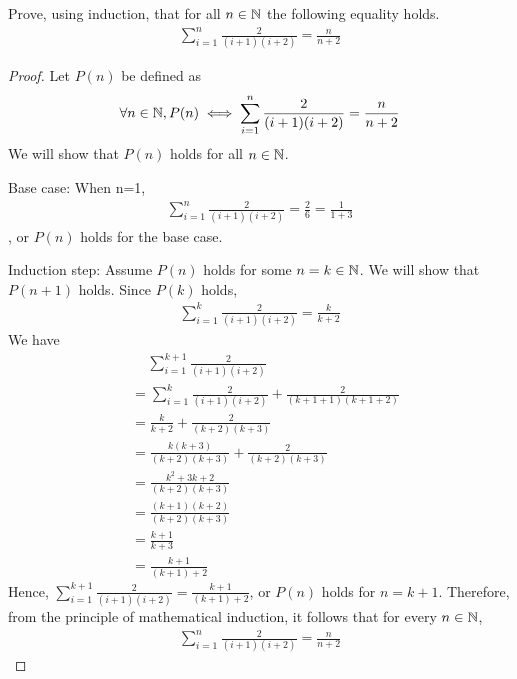 \begin{question}
    \normalfont
    Prove, using induction, that for all $n\in\mathbb N$ the following equality holds.
    \[
        \begin{aligned}
            \sum_{i=1}^{n}\frac{2}{(i+1)(i+2)}=\frac{n}{n+2}
        \end{aligned}
    \]
\end{question}

\begin{proof}
    \renewcommand{\qedsymbol}{$\blacksquare$}
    Let $P(n)$ be defined as 
    \[
        \begin{aligned}
            \forall n\in\mathbb N, P(n)\iff \sum_{i=1}^{n}\frac{2}{(i+1)(i+2)}=\frac{n}{n+2}
        \end{aligned}
    \]
    We will show that $P(n)$ holds for all $n\in\mathbb N$.

    Base case: When n=1, 
    \[
        \begin{aligned}
            \sum_{i=1}^{n}\frac{2}{(i+1)(i+2)}=\frac{2}{6}=\frac{1}{1+3}
        \end{aligned}
    \]
    , or $P(n)$ holds for the base case.

    Induction step: Assume $P(n)$ holds for some $n=k\in\mathbb N$. We will show that $P(n+1)$ holds.
    Since $P(k)$ holds, 
    \[
        \begin{aligned}
            \sum_{i=1}^{k}\frac{2}{(i+1)(i+2)}=\frac{k}{k+2}
        \end{aligned}
    \]
    We have 
    \[
        \begin{aligned}
            &\quad\, \sum_{i=1}^{k+1}\frac{2}{(i+1)(i+2)}\\
            &= \sum_{i=1}^{k}\frac{2}{(i+1)(i+2)}+\frac{2}{(k+1+1)(k+1+2)}\\
            &= \frac{k}{k+2}+\frac{2}{(k+2)(k+3)}\\
            &= \frac{k(k+3)}{(k+2)(k+3)}+\frac{2}{(k+2)(k+3)}\\
            &= \frac{k^2+3k+2}{(k+2)(k+3)}\\
            &= \frac{(k+1)(k+2)}{(k+2)(k+3)}\\
            &= \frac{k+1}{k+3}\\
            &= \frac{k+1}{(k+1)+2}
        \end{aligned}
    \]
    Hence, $\sum_{i=1}^{k+1}\frac{2}{(i+1)(i+2)}=\frac{k+1}{(k+1)+2}$, or $P(n)$ holds for $n=k+1$. Therefore, from the principle of mathematical induction, it follows that for every $n\in\mathbb N$, 
    \[
        \begin{aligned}
            \sum_{i=1}^{n}\frac{2}{(i+1)(i+2)}=\frac{n}{n+2}
        \end{aligned}
    \]
\end{proof}
